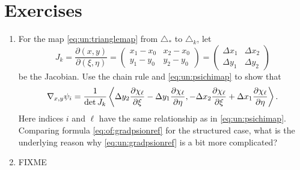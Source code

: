 

\section{Exercises}

\renewcommand{\labelenumi}{\arabic{chapter}.\arabic{enumi}\quad}
\renewcommand{\labelenumii}{(\alph{enumii})}
\begin{enumerate}
\item  \label{exer:un:gradientdetails}  For the map \eqref{eq:un:trianglemap} from $\triangle_\ast$ to $\triangle_k$, let
    $$J_k = \frac{\partial (x,y)}{\partial (\xi,\eta)} = \begin{pmatrix}
    x_1 - x_0 & x_2 - x_0 \\
    y_1 - y_0 & y_2 - y_0 \end{pmatrix}
    = \begin{pmatrix}
    \Delta x_1 & \Delta x_2 \\
    \Delta y_1 & \Delta y_2
    \end{pmatrix}$$
be the Jacobian.  Use the chain rule and \eqref{eq:un:psichimap} to show that
\begin{equation}
\nabla_{x,y} \psi_i = \frac{1}{\det J_k} \left<\Delta y_2 \frac{\partial \chi_\ell}{\partial \xi} - \Delta y_1 \frac{\partial \chi_\ell}{\partial \eta}, - \Delta x_2 \frac{\partial \chi_\ell}{\partial \xi} + \Delta x_1 \frac{\partial \chi_\ell}{\partial \eta}\right>. \label{eq:un:gradpsionref}
\end{equation}
Here indices $i$ and $\ell$ have the same relationship as in \eqref{eq:un:psichimap}.  Comparing formula \eqref{eq:of:gradpsionref} for the structured case, what is the underlying reason why \eqref{eq:un:gradpsionref} is a bit more complicated?  %
\item  \label{exer:un:elementintegranddetails}  FIXME
\end{enumerate}

